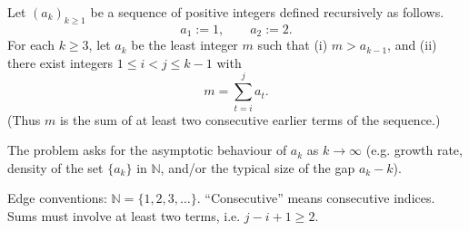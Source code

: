 Let $(a_k)_{k\ge 1}$ be a sequence of positive integers defined recursively as follows.
\[
 a_1:=1,\qquad a_2:=2.
\]
For each $k\ge 3$, let $a_k$ be the least integer $m$ such that
(i) $m>a_{k-1}$, and
(ii) there exist integers $1\le i<j\le k-1$ with
\[
 m=\sum_{t=i}^j a_t.
\]
(Thus $m$ is the sum of at least two consecutive earlier terms of the sequence.)

The problem asks for the asymptotic behaviour of $a_k$ as $k\to\infty$ (e.g. growth rate, density of the set $\{a_k\}$ in $\mathbb N$, and/or the typical size of the gap $a_k-k$).

Edge conventions: $\mathbb N=\{1,2,3,\dots\}$. “Consecutive” means consecutive indices. Sums must involve at least two terms, i.e. $j-i+1\ge 2$.

